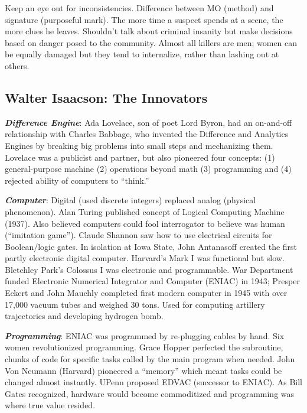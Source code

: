 \documentclass[
]{article}
\begin{document}
Keep an eye out for inconsistencies. Difference between MO (method) and
signature (purposeful mark). The more time a suspect spends at a scene,
the more clues he leaves. Shouldn't talk about criminal insanity but
make decisions based on danger posed to the community. Almost all
killers are men; women can be equally damaged but they tend to
internalize, rather than lashing out at others.

\hypertarget{walter-isaacson-the-innovators}{%
\subsection{Walter Isaacson: The
Innovators}\label{walter-isaacson-the-innovators}}

\textbf{\emph{Difference Engine}}: Ada Lovelace, son of poet Lord Byron,
had an on-and-off relationship with Charles Babbage, who invented the
Difference and Analytics Engines by breaking big problems into small
steps and mechanizing them. Lovelace was a publicist and partner, but
also pioneered four concepts: (1) general-purpose machine (2) operations
beyond math (3) programming and (4) rejected ability of computers to
``think.''

\textbf{\emph{Computer}}: Digital (used discrete integers) replaced
analog (physical phenomenon). Alan Turing published concept of Logical
Computing Machine (1937). Also believed computers could fool
interrogator to believe was human (``imitation game''). Claude Shannon
saw how to use electrical circuits for Boolean/logic gates. In isolation
at Iowa State, John Antanasoff created the first partly electronic
digital computer. Harvard's Mark I was functional but slow. Bletchley
Park's Colossus I was electronic and programmable. War Department funded
Electronic Numerical Integrator and Computer (ENIAC) in 1943; Presper
Eckert and John Mauchly completed first modern computer in 1945 with
over 17,000 vacuum tubes and weighed 30 tons. Used for computing
artillery trajectories and developing hydrogen bomb.

\textbf{\emph{Programming}}: ENIAC was programmed by re-plugging cables
by hand. Six women revolutionized programming. Grace Hopper perfected
the subroutine, chunks of code for specific tasks called by the main
program when needed. John Von Neumann (Harvard) pioneered a ``memory''
which meant tasks could be changed almost instantly. UPenn proposed
EDVAC (successor to ENIAC). As Bill Gates recognized, hardware would
become commoditized and programming was where true value resided.
\end{document}
